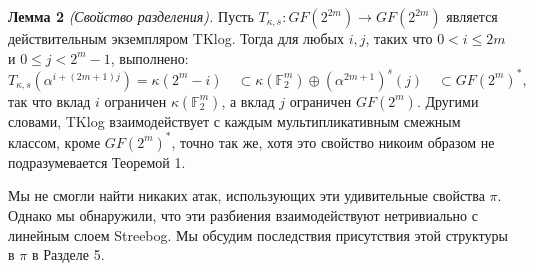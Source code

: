 \textbf{Лемма 2} \textit{(Свойство разделения).} Пусть \( T_{\kappa,s} : GF(2^{2m}) \to GF(2^{2m}) \) является действительным экземпляром TKlog. Тогда для любых \( i, j \), таких что \( 0 < i \leq 2m \) и \( 0 \leq j < 2^m - 1 \), выполнено:
\[
T_{\kappa,s}(\alpha^{i+(2m+1)j}) = \kappa(2^m - i)
\quad \subset \kappa(\mathbb{F}_{2}^{m})
\oplus (\alpha^{2m+1})^s(j)
\quad \subset GF(2^m)^{\ast},
\]
так что вклад \( i \) ограничен \( \kappa(\mathbb{F}_{2}^{m}) \), а вклад \( j \) ограничен \( GF(2^m) \).
Другими словами, TKlog взаимодействует с каждым мультипликативным смежным классом, кроме \( GF(2^m)^{\ast} \), точно так же, хотя это свойство никоим образом не подразумевается Теоремой 1.

Мы не смогли найти никаких атак, использующих эти удивительные свойства \( \pi \). Однако мы обнаружили, что эти разбиения взаимодействуют нетривиально с линейным слоем Streebog. Мы обсудим последствия присутствия этой структуры в \( \pi \) в Разделе 5.